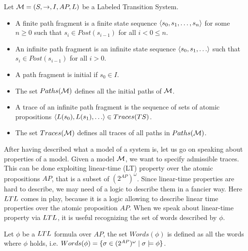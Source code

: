\begin{definition}
Let $\mathcal{M} = \left( S, \to, I, AP, L \right)$ be a Labeled Transition System. 
\begin{itemize}
    \item A finite path fragment is a finite state sequence $\left\langle s_0,s_1,\dots,s_n \right\rangle$ for some $n\geq 0$ such that $s_i \in Post(s_{i-1})$ for all $i < 0 \leq n$.
    \item An infinite path fragment is an infinite state sequence $\sequence{s_0,s_1,\dots}$ such that $s_i \in Post(s_{i-1})$ for all $i > 0$.
    \item A path fragment is initial if $s_0 \in I$. 
    \item The set $Paths(\mathcal{M})$ defines all the initial paths of $\mathcal{M}$.
    \item A trace of an infinite path fragment is the sequence of sets of atomic propositions $\sequence{L(s_0), L(s_1), \dots} \in Traces(TS)$.
    \item The set $Traces(\mathcal{M})$ defines all traces of all paths in $Paths(\mathcal{M})$.
\end{itemize}
\end{definition}

After having described what a model of a system is, let us go on speaking about properties of a model. 
Given a model $\mathcal{M}$, we want to specify admissible traces. 
This can be done exploiting linear-time (LT) property over the atomic propositions $AP$, that is a subset of $(2^{AP})^\omega$. 
Since linear-time properties are hard to describe, we may need of a logic to describe them in a fancier way. 
Here $LTL$ comes in play, because it is a logic allowing to describe linear time properties over the atomic proposition $AP$. 
When we speak about linear-time property via $LTL$, it is useful recognizing the set of words described by $\phi$.

\begin{definition}
Let $\phi$ be a $LTL$ formula over $AP$, the set $Words(\phi)$ is defined as all the words where $\phi$ holds, i.e. $Words(\phi) = \{ \sigma \in (2^{AP})^\omega \; | \; \sigma \models \phi \}$.
\end{definition}

